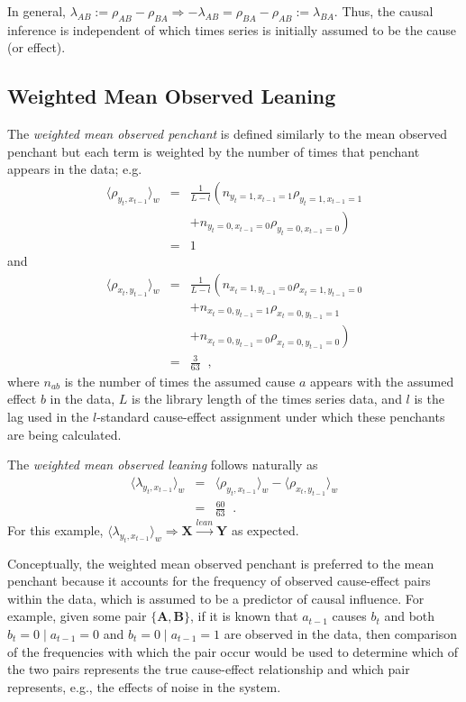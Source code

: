 \documentclass[twocolumn,aps,pre,groupedaddress]{revtex4-1}
\begin{document}
In general, $\lambda_{AB} := \rho_{AB} - \rho_{BA}\Rightarrow -\lambda_{AB} = \rho_{BA} - \rho_{AB} := \lambda_{BA}$.  Thus, the causal inference is independent of which times series is initially assumed to be the cause (or effect).  

\subsection{Weighted Mean Observed Leaning}
\label{sec:wmean}
The {\em weighted mean observed penchant} is defined similarly to the mean observed penchant but each term is weighted by the number of times that penchant appears in the data; e.g.\
\begin{eqnarray*}
\langle \rho_{y_t,x_{t-1}} \rangle_w &=& \frac{1}{L-l}\left(n_{y_t=1,x_{t-1}=1}\rho_{y_t=1,x_{t-1}=1} \right.\\
& & \left.+ n_{y_t=0,x_{t-1}=0}\rho_{y_t=0,x_{t-1}=0}\right)\\
&=& 1
\end{eqnarray*}
and
\begin{eqnarray*}
\langle \rho_{x_t,y_{t-1}} \rangle_w &=& \frac{1}{L-l}\left(n_{x_t=1,y_{t-1}=0}\rho_{x_t=1,y_{t-1}=0} \right.\\
& & +n_{x_t=0,y_{t-1}=1}\rho_{x_t=0,y_{t-1}=1}\\
& & \left.+ n_{x_t=0,y_{t-1}=0}\rho_{x_t=0,y_{t-1}=0}\right)\\
&=& \frac{3}{63}\;\;,
\end{eqnarray*}
where $n_{ab}$ is the number of times the assumed cause $a$ appears with the assumed effect $b$ in the data, $L$ is the library length of the times series data, and $l$ is the lag used in the $l$-standard cause-effect assignment under which these penchants are being calculated.  

The {\em weighted mean observed leaning} follows naturally as
\begin{eqnarray*}
\langle \lambda_{y_t,x_{t-1}} \rangle_w &=& \langle \rho_{y_t,x_{t-1}} \rangle_w - \langle \rho_{x_t,y_{t-1}} \rangle_w\\
&=& \frac{60}{63}\;\;.
\end{eqnarray*}
For this example, $\langle \lambda_{y_t,x_{t-1}} \rangle_w\Rightarrow \mathbf{X}\xrightarrow{lean}\mathbf{Y}$ as expected.

Conceptually, the weighted mean observed penchant is preferred to the mean penchant because it accounts for the frequency of observed cause-effect pairs within the data, which is assumed to be a predictor of causal influence.  For example, given some pair $\{\mathbf{A},\mathbf{B}\}$, if it is known that $a_{t-1}$ causes $b_{t}$ and both $b_t = 0\; |\; a_{t-1} = 0$ and $b_t = 0\; |\; a_{t-1} = 1$ are observed in the data, then comparison of the frequencies with which the pair occur would be used to determine which of the two pairs represents the true cause-effect relationship and which pair represents, e.g., the effects of noise in the system.
\end{document}
